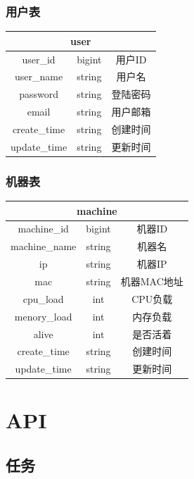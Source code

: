 ﻿\documentclass[a4paper]{report}
\begin{document}
\subsection{用户表} %
\begin{tabular}{|c|c|c|}
	\hline \multicolumn{3}{|c|}{user}\\
	\hline user\_id           &bigint    &用户ID\\
	\hline user\_name         &string    &用户名\\
	\hline password           &string    &登陆密码\\
	\hline email         	  &string    &用户邮箱\\
	\hline create\_time   	  &string    &创建时间\\
	\hline update\_time       &string    &更新时间\\
	\hline 
\end{tabular}



\subsection{机器表} %
\begin{tabular}{|c|c|c|}
	\hline \multicolumn{3}{|c|}{machine}\\
	\hline machine\_id           &bigint    &机器ID\\
	\hline machine\_name         &string    &机器名\\
	\hline ip                    &string    &机器IP\\
	\hline mac         	         &string    &机器MAC地址\\
	\hline cpu\_load         	 &int    	&CPU负载\\
	\hline menory\_load          &int    	&内存负载\\
	\hline alive         	 	 &int    	&是否活着\\
	\hline create\_time   	     &string    &创建时间\\
	\hline update\_time          &string    &更新时间\\
	\hline 
\end{tabular}







\chapter{API} %
\label{sec:api}
\section{任务} %
\end{document}
